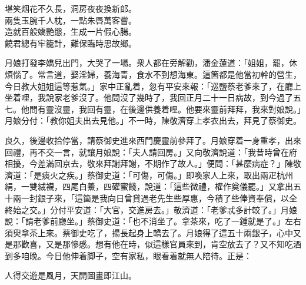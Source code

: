 \begin{myquote}
堪笑烟花不久長，洞房夜夜換新郎。\\兩隻玉腕千人枕，一點朱唇萬客嘗。\\造就百般嬌艷態，生成一片假心腸。\\饒君總有牢籠計，難保臨時思故鄉。
\end{myquote}

月娘打發李嬌兒出門，大哭了一場。衆人都在旁解勸，潘金蓮道：「姐姐，罷，休煩惱了。常言道，娶淫婦，養海青，食水不到想海東。這箇都是他當初幹的營生，今日教大姐姐這等惹氣。」家中正亂着，忽有平安來報：「巡鹽蔡老爹來了，在廳上坐着哩，我說家老爹沒了。他問沒了幾時了，我回正月二十一日病故，到今過了五七。他問有靈沒靈，我回有靈，在後邊供養着哩。他要來靈前拜拜，我來對娘說。」月娘分付：「教你姐夫出去見他。」不一時，陳敬濟穿上孝衣出去，拜見了蔡御史。

良久，後邊收拾停當，請蔡御史進來西門慶靈前參拜了。月娘穿着一身重孝，出來回禮，再不交一言，就讓月娘說：「夫人請回房。」又向敬濟說道：「我昔時曾在府相擾，今差滿回京去，敬來拜謝拜謝，不期作了故人。」便問：「甚麼病症？」陳敬濟道：「是痰火之疾。」蔡御史道：「可傷，可傷。」即喚家人上來，取出兩疋杭州絹，一雙絨襪，四尾白鯗，四礶蜜餞，說道：「這些微禮，權作奠儀罷。」又拿出五十兩一封銀子來，「這箇是我向日曾貸過老先生些厚惠，今積了些俸資奉償，以全終始之交。」{}分付平安道：「大官，交進房去。」敬濟道：「老爹忒多計較了。」月娘說：「請老爹前廳坐。」蔡御史道：「也不消坐了。拿茶來，吃了一鍾就是了。」左右須臾拿茶上來。蔡御史吃了，揚長起身上轎去了。月娘得了這五十兩銀子，心中又是那歡喜，又是那慘慼。想有他在時，似這樣官員來到，肯空放去了？又不知吃酒到多咱晚。今日他伸着脚子，空有家私，眼看着就無人陪待。正是：

\begin{myquote}
人得交遊是風月，天開圖畫即江山。
\end{myquote}

